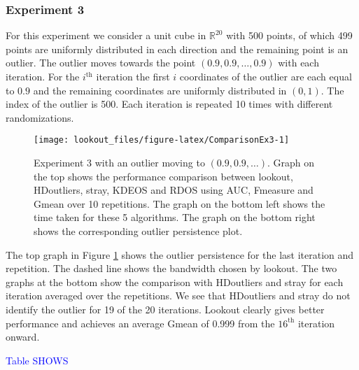 \documentclass[
]{article}
\begin{document}
\hypertarget{experiment-3}{%
\subsubsection*{Experiment 3}\label{experiment-3}}

For this experiment we consider a unit cube in \(\mathbb{R}^{20}\) with
500 points, of which 499 points are uniformly distributed in each
direction and the remaining point is an outlier. The outlier moves
towards the point \(\left( 0.9, 0.9, \dots, 0.9 \right)\) with each
iteration. For the \(i^{\text{th}}\) iteration the first \(i\)
coordinates of the outlier are each equal to \(0.9\) and the remaining
coordinates are uniformly distributed in \((0,1)\). The index of the
outlier is 500. Each iteration is repeated 10 times with different
randomizations.

\begin{figure}
\texttt{[image: lookout\_files/figure-latex/ComparisonEx3-1]} \caption{Experiment 3 with an outlier moving to $(0.9, 0.9, \dots)$. Graph on the top shows the performance comparison between lookout, HDoutliers, stray, KDEOS and RDOS using AUC, Fmeasure and Gmean over 10 repetitions. The graph on the bottom left shows the time taken for these 5 algorithms. The graph on the bottom right shows the corresponding outlier persistence plot.}\label{fig:ComparisonEx3}
\end{figure}

The top graph in Figure \ref{fig:ComparisonEx3} shows the outlier
persistence for the last iteration and repetition. The dashed line shows
the bandwidth chosen by lookout. The two graphs at the bottom show the
comparison with HDoutliers and stray for each iteration averaged over
the repetitions. We see that HDoutliers and stray do not identify the
outlier for 19 of the 20 iterations. Lookout clearly gives better
performance and achieves an average Gmean of 0.999 from the
\(16^{\text{th}}\) iteration onward.

\textcolor{blue}{Table SHOWS}
\end{document}
